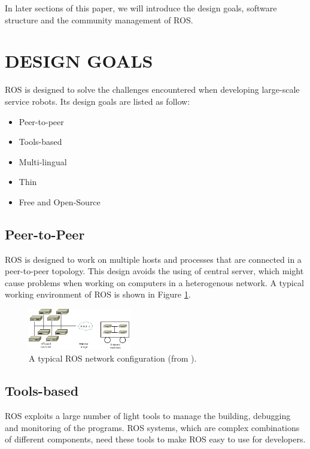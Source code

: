\documentclass[a4paper, 10pt, conference]{ieeeconf}       %
\begin{document}
In later sections of this paper, we will introduce the design goals, software structure and the community management of ROS. 

\section{DESIGN GOALS}

ROS is designed to solve the challenges encountered when developing large-scale service robots\cite{quigley_ros:_2009}. Its design goals are listed as follow:
\begin{itemize}
  \item Peer-to-peer
  \item Tools-based
  \item Multi-lingual
  \item Thin
  \item Free and Open-Source
\end{itemize}

\subsection{Peer-to-Peer}

ROS is designed to work on multiple hosts and processes that are connected in a peer-to-peer topology. This design avoids the using of central server, which might cause problems when working on computers in a heterogenous network. A typical working environment of ROS is shown in Figure \ref{fig:network}.

\begin{figure}[htpb]
  \centering
  \includegraphics[width=0.4\textwidth]{network}
  \caption{A typical ROS network configuration (from \cite{quigley_ros:_2009}).}
  \label{fig:network}
\end{figure}

\subsection{Tools-based} 

ROS exploits a large number of light tools to manage the building, debugging and monitoring of the programs. ROS systems, which are complex combinations of different components, need these tools to make ROS easy to use for developers.
\end{document}
